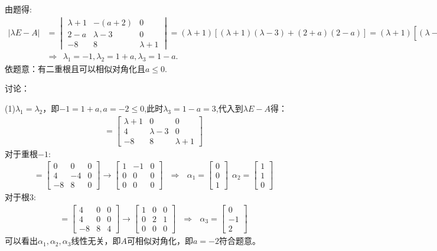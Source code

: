 \documentclass{article}
\begin{document}
\begin{jie}
由题得:
\begin{align*}
|\lambda E-A|&=
\begin{vmatrix}
  \lambda+1 & -(a+2) & 0\\
  2-a & \lambda-3 & 0\\
 -8 & 8 & \lambda+1
\end{vmatrix}=(\lambda+1)[(\lambda+1)(\lambda-3)+(2+a)(2-a)]=(\lambda+1)[(\lambda-1)^2-a^2]=0\\
&\Rightarrow ~~\lambda_{1}=-1,\lambda_2=1+a,\lambda_{3}=1-a.
\end{align*}
依题意：有二重根且可以相似对角化且$a\leq0$.

讨论：

(1)$\lambda_1=\lambda_2$，即$-1=1+a,a=-2\leq 0$,此时$\lambda_{3}=1-a=3$,代入到${\lambda E-A}$得：
\begin{align*}
[\lambda E-A]=
\begin{bmatrix}
  \lambda+1 & 0 & 0\\
  4 & \lambda-3 & 0\\
 -8 & 8 & \lambda+1
\end{bmatrix}
\end{align*}
对于重根$-1$:
\begin{align*}
[\lambda E-A]=
\begin{bmatrix}
  0 & 0 & 0\\
  4 & -4 & 0\\
 -8 & 8 & 0
\end{bmatrix}
\rightarrow
\begin{bmatrix}
  1 & -1 & 0\\
  0 & 0 & 0\\
 0 & 0 & 0
\end{bmatrix}~~~\Rightarrow~~~\alpha_1=
\begin{bmatrix}
0\\
0\\
1
\end{bmatrix}~~\alpha_2=
\begin{bmatrix}
1\\
1\\
0
\end{bmatrix}
\end{align*}
对于根$3$:
\begin{align*}
[\lambda E-A]=
\begin{bmatrix}
  4 & 0 & 0\\
  4 & 0 & 0\\
 -8 & 8 & 4
\end{bmatrix}
\rightarrow
\begin{bmatrix}
  1 & 0 & 0\\
  0 & 2 & 1\\
 0 & 0 & 0
\end{bmatrix}~~~\Rightarrow~~~\alpha_3=
\begin{bmatrix}
0\\
-1\\
2
\end{bmatrix}
\end{align*}
可以看出$\alpha_{1},\alpha_{2},\alpha_3$线性无关，即$A$可相似对角化，即$a=-2$符合题意。


\end{jie}
\end{document}
